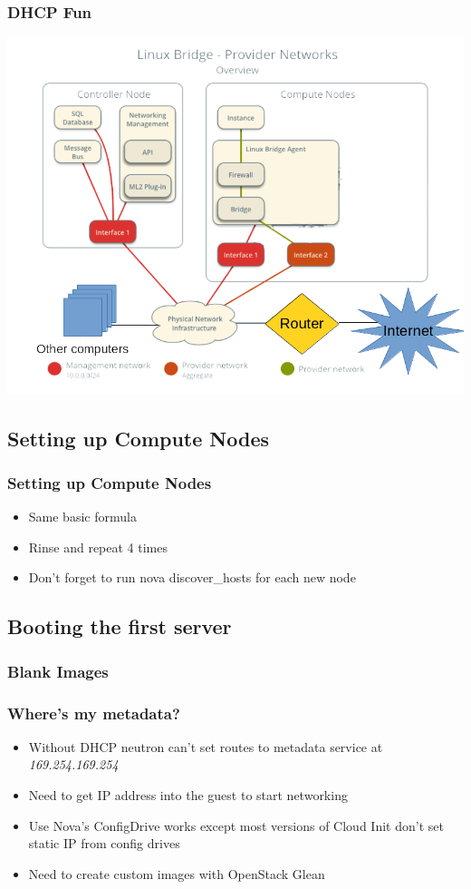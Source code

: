 \documentclass[aspectratio=169,11pt,hyperref={colorlinks=true}]{beamer}
\begin{document}
\begin{frame}
    \frametitle{DHCP Fun}
    \centering
    \includegraphics[width=.7\textwidth]{network-topology-with-router.png}
\end{frame}

\subsection{Setting up Compute Nodes}
\begin{frame}
    \frametitle{Setting up Compute Nodes}
    \begin{itemize}
        \item Same basic formula
        \item Rinse and repeat 4 times
        \item Don't forget to run nova discover\_hosts for each new node
    \end{itemize}
\end{frame}


\subsection{Booting the first server}
\begin{frame}
    
\end{frame}

\begin{frame}
    \frametitle{Blank Images}
    
\end{frame}

\begin{frame}
    \frametitle{Where's my metadata?}
    \begin{itemize}
        \item Without DHCP neutron can't set routes to metadata service at \textit{169.254.169.254}
        \item Need to get IP address into the guest to start networking
        \item Use Nova's ConfigDrive works except most versions of Cloud Init don't set static IP from config drives
        \item Need to create custom images with OpenStack Glean
    \end{itemize}
\end{frame}
\end{document}
